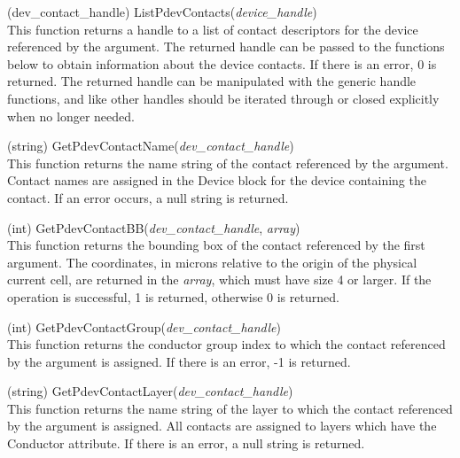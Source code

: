 \begin{description}
\item{(dev\_contact\_handle) \vt ListPdevContacts({\it device\_handle\/})}\\
This function returns a handle to a list of contact descriptors for
the device referenced by the argument.  The returned handle can be
passed to the functions below to obtain information about the device
contacts.  If there is an error, 0 is returned.  The returned handle
can be manipulated with the generic handle functions, and like other
handles should be iterated through or closed explicitly when no longer
needed.

\item{(string) \vt GetPdevContactName({\it dev\_contact\_handle\/})}\\
This function returns the name string of the contact referenced by the
argument.  Contact names are assigned in the Device block for the
device containing the contact.  If an error occurs, a null string is
returned.

\item{(int) \vt GetPdevContactBB({\it dev\_contact\_handle}, {\it array\/})}\\
This function returns the bounding box of the contact referenced by
the first argument.  The coordinates, in microns relative to the
origin of the physical current cell, are returned in the {\it array},
which must have size 4 or larger.  If the operation is successful, 1
is returned, otherwise 0 is returned.

\item{(int) \vt GetPdevContactGroup({\it dev\_contact\_handle\/})}\\
This function returns the conductor group index to which the contact
referenced by the argument is assigned.  If there is an error, -1 is
returned.

\item{(string) \vt GetPdevContactLayer({\it dev\_contact\_handle\/})}\\
This function returns the name string of the layer to which the
contact referenced by the argument is assigned.  All contacts are
assigned to layers which have the {\et Conductor} attribute.  If there
is an error, a null string is returned.


\end{description}
